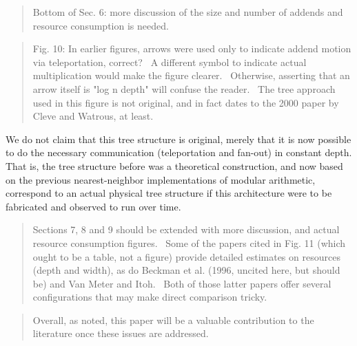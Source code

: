 \documentclass{article}
\theoremstyle{plain} \newtheorem{lemma}{Lemma}
\begin{document}
\begin{quote}
Bottom of Sec. 6: more discussion of the size and number of addends 
and resource consumption is needed. 
\end{quote}

\begin{quote}
Fig. 10: In earlier figures, arrows were used only to indicate addend 
motion via teleportation, correct?  A different symbol to indicate 
actual multiplication would make the figure clearer.  Otherwise, 
asserting that an arrow itself is "log n depth" will confuse the 
reader.  The tree approach used in this figure is not original, and in 
fact dates to the 2000 paper by Cleve and Watrous, at least. 
\end{quote}

We do not claim that this tree structure is original, merely that it is
now possible to do the necessary communication (teleportation and fan-out)
in constant depth. That is, the tree structure before was a theoretical
construction, and now based on the previous nearest-neighbor implementations
of modular arithmetic, correspond to an actual physical tree structure if
this architecture were to be fabricated and observed to run over time.

\begin{quote}
Sections 7, 8 and 9 should be extended with more discussion, and 
actual resource consumption figures.  Some of the papers cited in 
Fig. 11 (which ought to be a table, not a figure) provide detailed 
estimates on resources (depth and width), as do Beckman et al. (1996, 
uncited here, but should be) and Van Meter and Itoh.  Both of those 
latter papers offer several configurations that may make direct 
comparison tricky. 
\end{quote}

\begin{quote}
Overall, as noted, this paper will be a valuable contribution to the 
literature once these issues are addressed. 
\end{quote}



\end{document}

